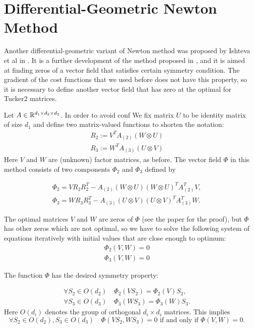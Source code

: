\section{Differential-Geometric Newton Method}
\label{sec_dg_newton}

Another differential-geometric variant of Newton method
was proposed by Ishteva et al in \cite{IDLAVH09}.
It is a further development of the method proposed in 
\cite{absil_2009}, and it is aimed at finding zeros
of a vector field that satisfies certain symmetry condition.
The gradient of the cost functions that we used before
does not have this property, so it is necessary to
define another vector field that has zero at the optimal
for Tucker2 matrices.  

Let $A \in \mathbb{R}^{d_1 \times d_2 \times d_3}$. In order to avoid conf
We fix matrix $U$ to be identity matrix of size $d_1$ and define two matrix-valued functions to shorten the notation:
\begin{eqnarray}
 R_2 := V^T A_{(2)} ( W \otimes U) \\
 R_3 := W^T A_{(3)} ( U \otimes V) 
\end{eqnarray}
Here $V$ and $W$ are (unknown) factor matrices, as before.
The vector field $\Phi$ in this method consists of two components
$\Phi_2$ and $\Phi_3$ defined by

\begin{eqnarray}
 \Phi_2 = V R_2 R_2^T - A_{(2)} ( W \otimes U)(W \otimes U)^T A_{(2)}^T V, \\
 \Phi_3 = W R_3 R_3^T - A_{(3)} ( U \otimes V)(U \otimes V)^T A_{(3)}^T W. 
\end{eqnarray}

The optimal matrices $V$ and $W$ are zeros of $\Phi$ (see the paper for the proof),
but $\Phi$ has other zeros which are not optimal, so we have to solve
the following system of equations iteratively with 
initial values that are close enough to optimum:
\begin{eqnarray}
    \Phi_2(V, W) = 0 \\
    \Phi_3(V, W) = 0
\end{eqnarray}

The function $\Phi$ has the desired symmetry property: 

\begin{eqnarray}
\forall S_2 \in O(d_2) \quad \Phi_2(VS_2) = \Phi_2(V) S_2, \\
\forall S_3 \in O(d_3) \quad \Phi_3(WS_3) = \Phi_3(W) S_3. 
\end{eqnarray}
Here $O(d_i)$ denotes the group of orthogonal $d_i \times d_i$ matrices. This implies
\begin{equation}
\forall S_2 \in O(d_2), S_3 \in O(d_3) \quad \Phi(VS_2, WS_3)= 0 \mbox{ if and only if } \Phi(V, W) = 0.
\end{equation}

